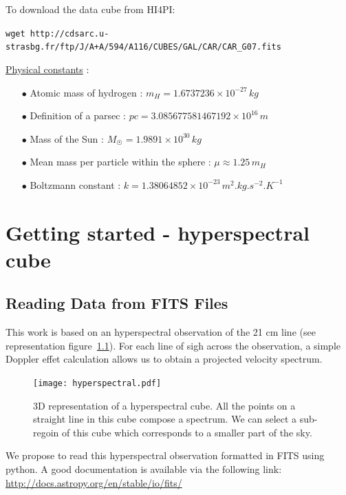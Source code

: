 \documentclass[a4paper,10.5pt]{report}
\begin{document}
To download the data cube from HI4PI:


\verb|wget http://cdsarc.u-strasbg.fr/ftp/J/A+A/594/A116/CUBES/GAL/CAR/CAR_G07.fits|


\newpage
\noindent
\underline{Physical constants} : \\
\begin{itemize}
\item[$\bullet$] Atomic mass of hydrogen : $m_H = 1.6737236 \times 10^{-27} \, kg$
\item[$\bullet$] Definition of a parsec : $pc = 3.085677581467192 \times 10^{16} \, m$
\item[$\bullet$] Mass of the Sun : $M_{\astrosun} = 1.9891 \times 10^{30} \, kg$
\item[$\bullet$] Mean mass per particle within the sphere : $\mu \approx 1.25 \, m_H$
\item[$\bullet$] Boltzmann constant : $k = 1.38064852 \times 10^{-23} \, m^2.kg.s^{-2}.K^{-1}$
\end{itemize}

\chapter{Getting started - hyperspectral cube}
\section{Reading Data from FITS Files}
This work is based on an hyperspectral observation of the 21 cm line
(see representation figure~\ref{fig::hyperspectral}). For each line of sigh across the observation, a simple Doppler effet
calculation allows us to obtain a projected velocity spectrum. \\

\begin{figure}[h!]
  \centering
  \texttt{[image: hyperspectral.pdf]}
  \label{fig::hyperspectral}
  \caption{3D representation of a hyperspectral cube. All the points on a straight line in this cube compose a spectrum.
  We can select a sub-regoin of this cube which corresponds to a smaller part of the sky.}
\end{figure}

We propose to read this hyperspectral observation formatted in FITS using python.
A good documentation is available via the following link:
\color{blue} \url{http://docs.astropy.org/en/stable/io/fits/} \color{black}
\end{document}
